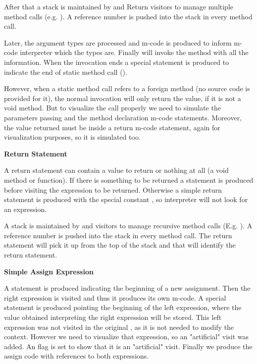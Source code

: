 After that a stack is maintained by  and Return
visitors to manage multiple method calls (e.g. ).
A reference number is pushed into the stack in every method call.

Later, the argument types are processed and m-code is produced to
inform m-code interpreter which the types are. Finally \djava{}
will invoke the method with all the information. When the invocation
ends a special statement is produced to indicate the end of static
method call ().

However, when a static method call refers to a foreign method
(no source code is provided for it), the normal invocation will only
return the value, if it is not a void method. But to visualize the
call properly we need to simulate the parameters passing and the
method declaration m-code statements. Moreover, the value returned
must be inside a return m-code statement, again for visualization
purposes, so it is simulated too.

{\bf{Return Statement}}

A return statement can contain a value to return or nothing at all
(a void method or function). If there is something to be returned a
 statement is produced before visiting the expression to be
returned. Otherwise a simple return statement is produced with the
special constant , so \jel{} interpreter will
not look for an expression.

A stack is maintained by  and  visitors
to manage recursive method calls (E.g. ).
A reference number is pushed into the stack in every method call.
The return statement will pick it up from the top of the stack and
that will identify the return statement.

{\bf{Simple Assign Expression}}

A  statement is produced indicating the beginning of a
new assignment. Then the right expression is visited and thus it
produces its own m-code. A special statement  is produced
pointing the beginning of the left expression, where the value
obtained interpreting the right expression will be stored. This
left expression was not visited in the original \djava{}, as
it is not needed to modify the context. However we need to visualize
that expression, so an "artificial" visit was added. An 
flag is set to show that it is an "artificial" visit. Finally we
produce the assign code with references to both expressions.

